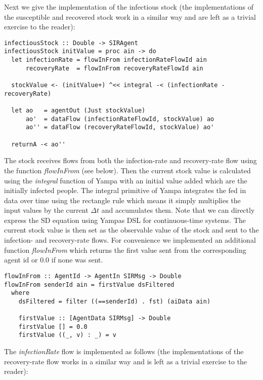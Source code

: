 Next we give the implementation of the infectious stock (the implementations of the susceptible and recovered stock work in a similar way and are left as a trivial exercise to the reader):

\begin{verbatim}
infectiousStock :: Double -> SIRAgent
infectiousStock initValue = proc ain -> do
  let infectionRate = flowInFrom infectionRateFlowId ain
      recoveryRate  = flowInFrom recoveryRateFlowId ain

  stockValue <- (initValue+) ^<< integral -< (infectionRate - recoveryRate)
  
  let ao   = agentOut (Just stockValue)
      ao'  = dataFlow (infectionRateFlowId, stockValue) ao
      ao'' = dataFlow (recoveryRateFlowId, stockValue) ao'
      
  returnA -< ao''
\end{verbatim}

The stock receives flows from both the infection-rate and recovery-rate flow using the function \textit{flowInFrom} (see below). Then the current stock value is calculated using the \textit{integral} function of Yampa with an initial value added which are the initially infected people. The integral primitive of Yampa integrates the fed in data over time using the rectangle rule which means it simply multiplies the input values by the current $\Delta t$ and accumulates them. Note that we can directly express the SD equation using Yampas DSL for continuous-time systems. The current stock value is then set as the observable value of the stock and sent to the infection- and recovery-rate flows. For convenience we implemented an additional function \textit{flowInFrom} which returns the first value sent from the corresponding agent id or 0.0 if none was sent.

\begin{verbatim}
flowInFrom :: AgentId -> AgentIn SIRMsg -> Double
flowInFrom senderId ain = firstValue dsFiltered
  where 
    dsFiltered = filter ((==senderId) . fst) (aiData ain)

    firstValue :: [AgentData SIRMsg] -> Double
    firstValue [] = 0.0
    firstValue ((_, v) : _) = v
\end{verbatim}
	
The \textit{infectionRate} flow is implemented as follows (the implementations of the recovery-rate flow works in a similar way and is left as a trivial exercise to the reader):

